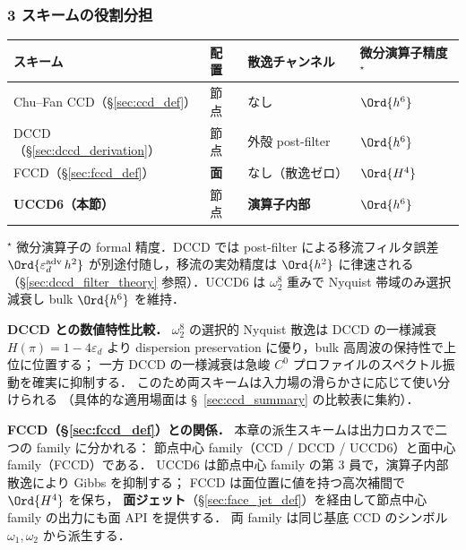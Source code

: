 \subsubsection{3 スキームの役割分担}
\label{sec:uccd6_scheme_comparison}

\begin{center}
\begin{tabular}{l l l l}
\hline
\textbf{スキーム} & \textbf{配置} & \textbf{散逸チャンネル} & \textbf{微分演算子精度}$^\star$ \\ \hline
Chu--Fan CCD（§\ref{sec:ccd_def}） & 節点 & なし & $\Ord{h^6}$ \\
DCCD（§\ref{sec:dccd_derivation}） & 節点 & 外殻 post-filter & $\Ord{h^6}$ \\
FCCD（§\ref{sec:fccd_def}） & \textbf{面} & なし（散逸ゼロ） & $\Ord{H^4}$ \\
\textbf{UCCD6（本節）} & 節点 & \textbf{演算子内部} & $\Ord{h^6}$ \\
\hline
\end{tabular}
\end{center}

{\footnotesize $^\star$ 微分演算子の formal 精度．DCCD では post-filter による移流フィルタ誤差 $\Ord{\varepsilon_d^\text{adv}\,h^2}$ が別途付随し，移流の実効精度は $\Ord{h^2}$ に律速される（§\ref{sec:dccd_filter_theory} 参照）．UCCD6 は $\omega_2^8$ 重みで Nyquist 帯域のみ選択減衰し bulk $\Ord{h^6}$ を維持．}

\noindent
\textbf{DCCD との数値特性比較．}
$\omega_2^8$ の選択的 Nyquist 散逸は DCCD の一様減衰 $H(\pi)=1-4\varepsilon_d$ より
dispersion preservation に優り，bulk 高周波の保持性で上位に位置する；
一方 DCCD の一様減衰は急峻 $C^0$ プロファイルのスペクトル振動を確実に抑制する．
このため両スキームは入力場の滑らかさに応じて使い分けられる
（具体的な適用場面は §~\ref{sec:ccd_summary} の比較表に集約）．

\noindent
\textbf{FCCD（§\ref{sec:fccd_def}）との関係．}
本章の派生スキームは出力ロカスで二つの family に分かれる：
節点中心 family（CCD / DCCD / UCCD6）と面中心 family（FCCD）である．
UCCD6 は節点中心 family の第 3 員で，演算子内部散逸により Gibbs を抑制する；
FCCD は面位置に値を持つ高次補間で $\Ord{H^4}$ を保ち，
\textbf{面ジェット}（§\ref{sec:face_jet_def}）を経由して節点中心 family の出力にも面 API を提供する．
両 family は同じ基底 CCD のシンボル $\omega_1, \omega_2$ から派生する．

